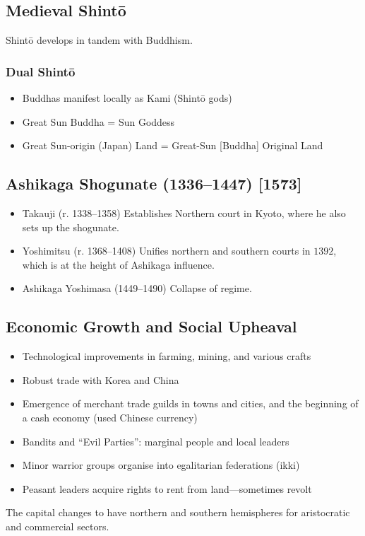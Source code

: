\documentclass[class=article, crop=false]{standalone}
\begin{document}
  \subsection{Medieval Shint\=o}
  \begin{note}{}
    Shint\=o develops in tandem with Buddhism.
  \end{note}
  \subsubsection{Dual Shint\=o}
  \begin{itemize}
    \item Buddhas manifest locally as Kami (Shint\=o gods)
    \item Great Sun Buddha = Sun Goddess
    \item Great Sun-origin (Japan) Land = Great-Sun [Buddha] Original Land
  \end{itemize}
  \subsection{Ashikaga Shogunate (1336--1447) [1573]}
  \begin{itemize}
    \item Takauji (r. 1338--1358) Establishes Northern court in Kyoto, where he also sets up the shogunate.
    \item Yoshimitsu (r. 1368--1408) Unifies northern and southern courts in $1392$, which is at the height of Ashikaga influence.
    \item Ashikaga Yoshimasa (1449--1490) Collapse of regime.
  \end{itemize}
  \subsection{Economic Growth and Social Upheaval}
  \begin{itemize}
    \item Technological improvements in farming, mining, and various crafts
    \item Robust trade with Korea and China
    \item Emergence of merchant trade guilds in towns and cities, and the beginning of a cash economy (used Chinese currency)
    \item Bandits and ``Evil Parties'': marginal people and local leaders
    \item Minor warrior groups organise into egalitarian federations (ikki)
    \item Peasant leaders acquire rights to rent from land---sometimes revolt
  \end{itemize}
  The capital changes to have northern and southern hemispheres for aristocratic and commercial sectors.
\end{document}
